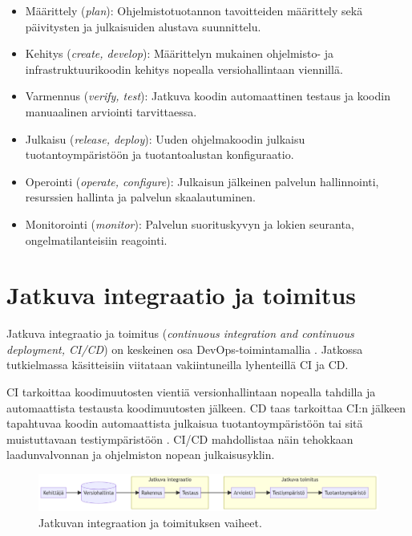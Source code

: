 \begin{itemize}
\item Määrittely (\textit{plan}): Ohjelmistotuotannon tavoitteiden määrittely sekä päivitysten ja julkaisuiden alustava suunnittelu.
\item Kehitys (\textit{create, develop}): Määrittelyn mukainen ohjelmisto- ja infrastruktuurikoodin kehitys nopealla versiohallintaan viennillä.
\item Varmennus (\textit{verify, test}): Jatkuva koodin automaattinen testaus ja koodin manuaalinen arviointi tarvittaessa.
\item Julkaisu (\textit{release, deploy}): Uuden ohjelmakoodin julkaisu tuotantoympäristöön ja tuotantoalustan konfiguraatio.
\item Operointi (\textit{operate, configure}): Julkaisun jälkeinen palvelun hallinnointi, resurssien hallinta ja palvelun skaalautuminen.
\item Monitorointi (\textit{monitor}): Palvelun suorituskyvyn ja lokien seuranta, ongelmatilanteisiin reagointi.
\end{itemize}

\section{Jatkuva integraatio ja toimitus}

Jatkuva integraatio ja toimitus (\textit{continuous integration and continuous deployment, CI/CD}) on keskeinen osa DevOps-toimintamallia \cite{Jabbari16, Leite19}.
Jatkossa tutkielmassa käsitteisiin viitataan vakiintuneilla lyhenteillä CI ja CD.

CI tarkoittaa koodimuutosten vientiä versionhallintaan nopealla tahdilla ja automaattista testausta koodimuutosten jälkeen.
CD taas tarkoittaa CI:n jälkeen tapahtuvaa koodin automaattista julkaisua tuotantoympäristöön tai sitä muistuttavaan testiympäristöön \cite{Shahin17}.
CI/CD mahdollistaa näin tehokkaan laadunvalvonnan ja ohjelmiston nopean julkaisusyklin.

\begin{figure}[ht]
\begin{center}
\includegraphics[width=1\textwidth]{figures/cicd-pipeline.png}
\caption{Jatkuvan integraation ja toimituksen vaiheet.\label{fig:cicd}}
\end{center}
\end{figure}

